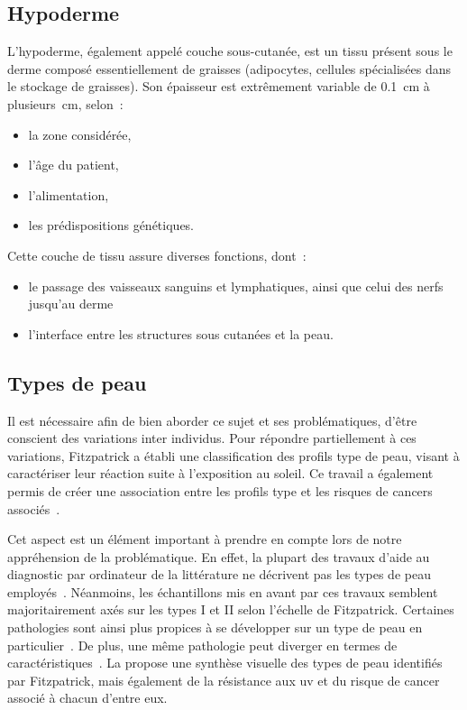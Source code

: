 \addtocounter{footnote}{1}
\clearpage

\subsection{Hypoderme}
L’hypoderme, également appelé couche sous-cutanée, est un tissu présent sous le derme composé essentiellement de graisses (adipocytes, cellules spécialisées dans le stockage de graisses). Son épaisseur est extrêmement variable de \SI{0,1}{\centi\metre} à \SI[parse-numbers = false]{plusieurs}{\centi\metre}, selon~:
\begin{itemize}
    \item la zone considérée,
    \item l’âge du patient,
    \item l’alimentation,
    \item les prédispositions génétiques.
\end{itemize}\par

Cette couche de tissu assure diverses fonctions, dont~:
\begin{itemize}
    \item le passage des vaisseaux sanguins et lymphatiques, ainsi que celui des nerfs jusqu’au derme
    \item l’interface entre les structures sous cutanées et la peau.
\end{itemize}\par

\subsection{Types de peau}
Il est nécessaire afin de bien aborder ce sujet et ses problématiques, d’être conscient des variations inter individus. Pour répondre partiellement à ces variations, Fitzpatrick a établi une classification des profils type de peau, visant à caractériser leur réaction suite à l’exposition au soleil. Ce travail a également permis de créer une association entre les profils type et les risques de cancers associés~\cite{Fitzpatrick1988}.\par

Cet aspect est un élément important à prendre en compte lors de notre appréhension de la problématique. En effet, la plupart des travaux d'aide au diagnostic par ordinateur de la littérature ne décrivent pas les types de peau employés~\cite{Celebi2007,Wiltgen2008,Koller2011}. Néanmoins, les échantillons mis en avant par ces travaux semblent majoritairement axés sur les types I et II selon l'échelle de Fitzpatrick. Certaines pathologies sont ainsi plus propices à se développer sur un type de peau en particulier~\cite{Narayanan2010}. De plus, une même pathologie peut diverger en termes de caractéristiques~\cite{Tuma2015}. La  propose une synthèse visuelle des types de peau identifiés par Fitzpatrick, mais également de la résistance aux \gls{uv} et du risque de cancer associé à chacun d'entre eux.\par


